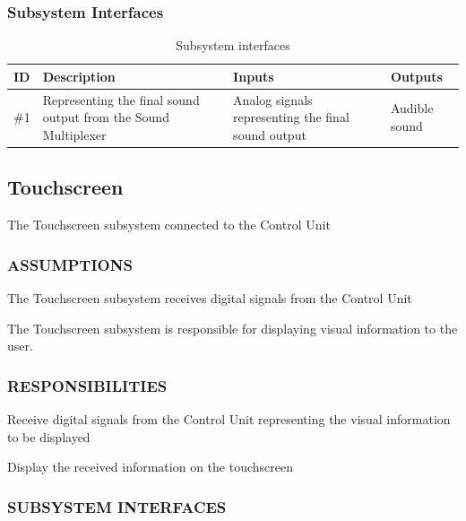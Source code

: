 \subsubsection{Subsystem Interfaces}

\begin {table}[H]
\caption {Subsystem interfaces} 
\begin{center}
    \begin{tabular}{ | p{1cm} | p{6cm} | p{3cm} | p{3cm} |}
    \hline
    ID & Description & Inputs & Outputs \\ \hline
    \#1 & Representing the final sound output from the Sound Multiplexer&Analog signals representing the final sound output & Audible sound  \\ \hline
    \end{tabular}
\end{center}
\end{table}

\subsection{Touchscreen}
The Touchscreen subsystem connected to the Control Unit
\subsubsection{ASSUMPTIONS}
\begin{itemize}
\begin{item}
The Touchscreen subsystem receives digital signals from the Control Unit
\end{item}
\begin{item}
The Touchscreen subsystem is responsible for displaying visual information to the user.
\end{item}
\end{itemize}
\subsubsection{RESPONSIBILITIES}
\begin{itemize}
\begin{item}
Receive digital signals from the Control Unit representing the visual information to be displayed
\end{item}
\begin{item}
Display the received information on the touchscreen
\end{item}
\end{itemize}

\subsubsection{SUBSYSTEM INTERFACES}

